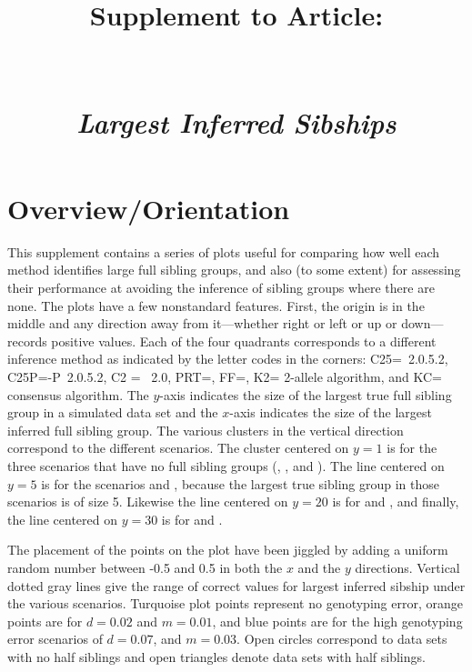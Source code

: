 \documentclass[11pt,landscape]{report}
\title{Supplement \SupNum{} to Article:\\
\ArticleName\\
\mbox{}\\
{\em Largest Inferred Sibships}}
\begin{document}
\maketitle
\section{Overview/Orientation}
This supplement contains a series of plots useful for comparing how well each method identifies large full sibling groups, and also (to some extent) for assessing their performance at avoiding the inference of sibling groups where there are none.  The plots have a few nonstandard features.  First, the origin is in the middle and any direction away from it---whether right or left or up or down---records positive values.  Each of the four quadrants corresponds to a different inference method as indicated by the letter codes in the corners: C25=\colony{}~2.0.5.2, C25P=\colony{}-P~2.0.5.2, C2 = \colony~2.0, PRT=\prt{}, FF=\familyfinder, K2=\kinalyzer{} 2-allele algorithm, and KC=\kinalyzer{} consensus algorithm.  The $y$-axis indicates the size of the largest true full sibling group in a simulated data set and the $x$-axis indicates the size of the largest inferred full sibling group.  The various clusters in the vertical direction correspond to the different scenarios.  The cluster centered on $y=1$ is for the three scenarios that have no full sibling groups (\nosibs{}, \allhalf{}, and \allpathalf{}).  The line centered on $y=5$ is for the scenarios \sfswh{} and \sfsnoh{}, because the largest true sibling group in those scenarios is of size 5.  Likewise the line centered on $y=20$ is for \slfsgnoh{} and \slfsgwh{}, and finally, the line centered on $y=30$ is for \onelargenoh{} and \onelargewh{}.  

The placement of the points on the plot have been jiggled by adding a uniform random number between -0.5 and 0.5 in both the $x$ and the $y$ directions.  Vertical dotted gray lines give the range of correct values for largest inferred sibship under the various scenarios.  Turquoise plot points represent no genotyping error, orange points are for $d=0.02$ and $m=0.01$, and blue points are for the high genotyping error scenarios of $d=0.07$, and $m=0.03$.  Open circles correspond to data sets with no half siblings and open triangles denote data sets with half siblings.
\end{document}

